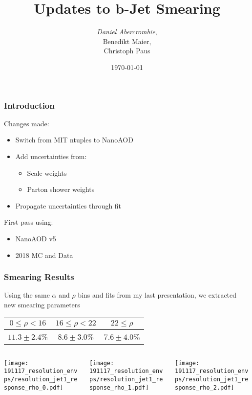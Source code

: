 \documentclass{beamer}
\author[D. Abercrombie]{
  \emph{Daniel Abercrombie}, \\
  Benedikt Maier, \\
  Christoph Paus
}
\title{\bf \sffamily Updates to b-Jet Smearing}
\date{\today}
\begin{document}
\begin{frame}
  \titlepage
\end{frame}

\begin{frame}
  \frametitle{Introduction}

  Changes made:

  \begin{itemize}
  \item Switch from MIT ntuples to NanoAOD
  \item Add uncertainties from:
    \begin{itemize}
    \item Scale weights
    \item Parton shower weights
    \end{itemize}
  \item Propagate uncertainties through fit
  \end{itemize}

  First pass using:

  \begin{itemize}
  \item NanoAOD v5
  \item 2018 MC and Data
  \end{itemize}

\end{frame}

\begin{frame}
  \frametitle{Smearing Results}

  Using the same $\alpha$ and $\rho$ bins and fits from my last presentation,
  we extracted new smearing parameters

  \vfill

  \centering

  \begin{tabular}{c | c | c}
    $0 \leq \rho < 16$ & $16 \leq \rho < 22$ & $22 \leq \rho$ \\
    \hline
   $11.3 \pm 2.4$\% & $8.6 \pm 3.0$\% & $7.6 \pm 4.0$\%
  \end{tabular}

  \vfill

  \begin{columns}
    \begin{column}{0.33\linewidth}
      \texttt{[image: 191117\_resolution\_envps/resolution\_jet1\_response\_rho\_0.pdf]}
    \end{column}
    \begin{column}{0.33\linewidth}
      \texttt{[image: 191117\_resolution\_envps/resolution\_jet1\_response\_rho\_1.pdf]}
    \end{column}
    \begin{column}{0.33\linewidth}
      \texttt{[image: 191117\_resolution\_envps/resolution\_jet1\_response\_rho\_2.pdf]}
    \end{column}
  \end{columns}

\end{frame}
\end{document}
